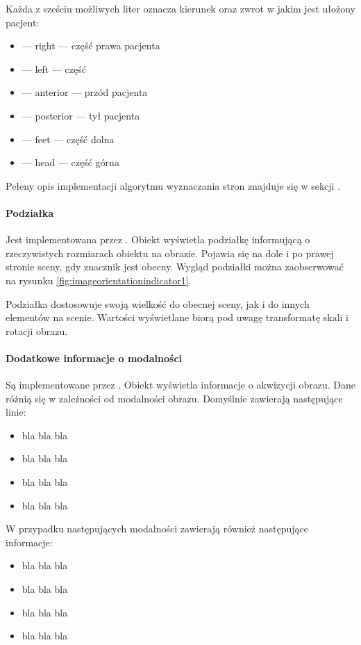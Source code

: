 \par
Każda z sześciu możliwych liter oznacza kierunek oraz zwrot w jakim jest ułożony pacjent:
\begin{itemize}
    \item {} --- right --- część prawa pacjenta
    \item {} --- left --- część
    \item {} --- anterior --- przód pacjenta
    \item {} --- posterior --- tył pacjenta
    \item {} --- feet --- część dolna
    \item {} --- head --- część górna
\end{itemize}

\par
Pełeny opis implementacji algorytmu wyznaczania stron znajduje się w sekcji \label{sec:algorithm-imageorientationindicator}.

\paragraph{Podziałka}

Jest implementowana przez .
Obiekt wyświetla podziałkę informującą o rzeczywistych rozmiarach obiektu na obrazie.
Pojawia się na dole i po prawej stronie sceny, gdy znacznik  jest obecny.
Wygląd podziałki można zaobserwować na rysunku \ref{fig:imageorientationindicator1}.

Podziałka dostosowuje swoją wielkość do obecnej sceny, jak i do innych elementów na scenie.
Wartości wyświetlane biorą pod uwagę transformatę skali i rotacji obrazu.

\paragraph{Dodatkowe informacje o modalności}

Są implementowane przez .
Obiekt wyświetla informacje o akwizycji obrazu.
Dane różnią się w zależności od modalności obrazu.
Domyślnie zawierają następujące linie:
\begin{itemize}
    \item bla bla bla
    \item bla bla bla
    \item bla bla bla
    \item bla bla bla
\end{itemize}

W przypadku następujących modalności zawierają również następujące informacje:
\begin{itemize}
    \item bla bla bla
    \item bla bla bla
    \item bla bla bla
    \item bla bla bla
\end{itemize}